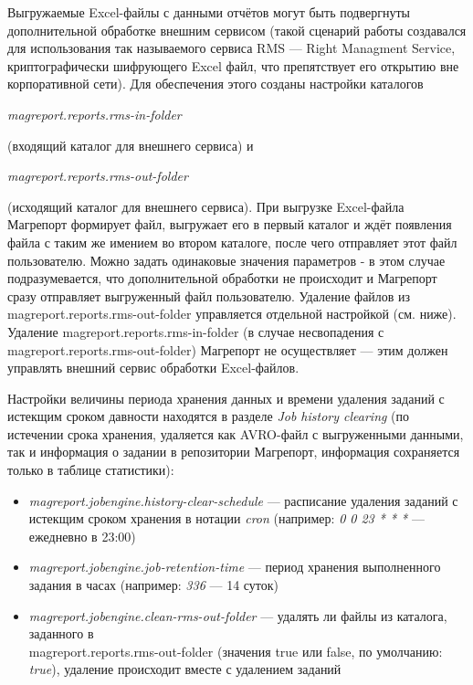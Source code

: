 \documentclass[../user-manual.tex]{subfiles}
\begin{document}
	Выгружаемые Excel-файлы с данными отчётов могут быть подвергнуты дополнительной обработке внешним сервисом (такой сценарий работы создавался для использования так называемого сервиса RMS --- Right Managment Service, криптографически шифрующего Excel файл, что препятствует его открытию вне корпоративной сети). Для обеспечения этого созданы настройки каталогов
	\begin{center}
		\textit{magreport.reports.rms-in-folder}
	\end{center}
	(входящий каталог для внешнего сервиса) и
	\begin{center}
		\textit{magreport.reports.rms-out-folder} 
	\end{center}
	(исходящий каталог для внешнего сервиса). При выгрузке Excel-файла Магрепорт формирует файл, выгружает его в первый каталог и ждёт появления файла с таким же имением во втором каталоге, после чего отправляет этот файл пользователю. Можно задать одинаковые значения параметров - в этом случае подразумевается, что дополнительной обработки не происходит и Магрепорт сразу отправляет выгруженный файл пользователю. Удаление файлов из magreport.reports.rms-out-folder управляется отдельной настройкой (см. ниже). Удаление magreport.reports.rms-in-folder (в случае несвопадения с magreport.reports.rms-out-folder) Магрепорт не осуществляет --- этим должен управлять внешний сервис обработки Excel-файлов.

	Настройки величины периода хранения данных и времени удаления заданий с истекщим сроком давности находятся в разделе \textit{Job history clearing} (по истечении срока хранения, удаляется как AVRO-файл с выгруженными данными, так и информация о задании в репозитории Магрепорт, информация сохраняется только в таблице статистики):
	
	\begin{itemize}
		\item \textit{magreport.jobengine.history-clear-schedule} --- расписание удаления заданий с истекщим сроком хранения в нотации \textit{cron} (например: \textit{0 0 23 * * *} --- ежедневно в 23:00)
		
		\item \textit{magreport.jobengine.job-retention-time} --- период хранения выполненного задания в часах (например: \textit{336} --- 14 суток)
		
		\item \textit{magreport.jobengine.clean-rms-out-folder} --- удалять ли файлы из каталога, заданного в \\
		magreport.reports.rms-out-folder (значения true или false, по умолчанию: \textit{true}), удаление происходит вместе с удалением заданий
		
	\end{itemize}
	
\end{document}
